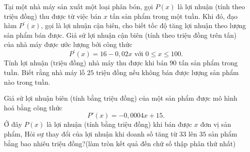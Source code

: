 \begin{ex}%
	Tại một nhà máy sản xuất một loại phân bón, gọi $P(x)$ là lợi nhuận (tính theo triệu đồng) thu được từ việc bán $x$ tấn sản phẩm trong một tuần. Khi đó, đạo hàm $P^{\prime}(x)$, gọi là lợi nhuận cận biên, cho biết tốc độ tăng lợi nhuận theo lượng sản phẩm bán được. Giả sử lợi nhuận cận biên (tính theo triệu đồng trên tấn) của nhà máy được ước lượng bởi công thức
	$$
	P^{\prime}(x)=16-0{,}02 x \text { với } 0 \leq x \leq 100.
	$$
	Tính lợi nhuận (triệu đồng) nhà máy thu được khi bán $90$ tấn sản phẩm trong tuần. Biết rằng nhà máy lỗ $25$ triệu đồng nếu không bán được lượng sản phẩm nào trong tuần.
\end{ex}

\begin{ex}%
	Giả sử lợi nhuận biên (tính bằng triệu đồng) của một sản phẩm được mô hình hoá bằng công thức 
	$$P'(x)=-0,0004x+15.$$
	Ở đây $P(x)$ là lợi nhuận (tính bằng triệu đồng) khi bán được $x$ đơn vị sản phẩm, Hỏi sự thay đổi của lợi nhuận khi doanh số tăng từ $33$ lên $35$ sản phẩm bằng bao nhiêu triệu đồng?(làm tròn kết quả đến chữ số thập phân thứ nhất) \\ 
\end{ex}

